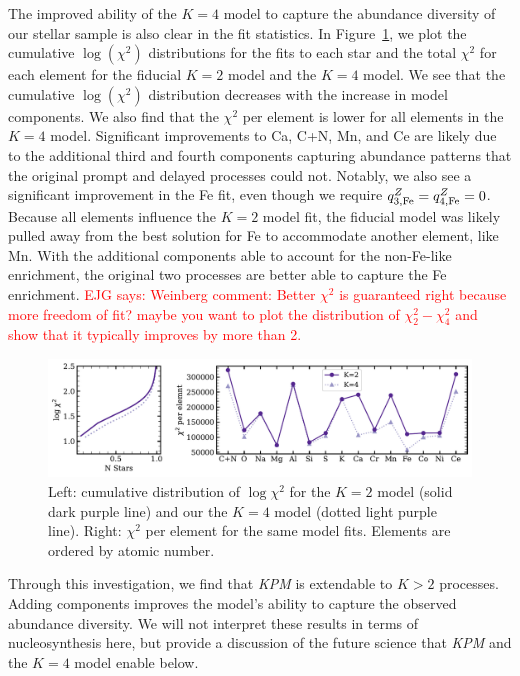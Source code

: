 \documentclass[modern]{aastex631}
\newcommand{\ejg}[1]{\textcolor{red}{EJG says: #1}}
\newcommand{\name}{\textsl{KPM}}
\begin{document}
The improved ability of the $K=4$ model to capture the abundance diversity of our stellar sample is also clear in the fit statistics. In Figure~\ref{fig:comp_Ks}, we plot the cumulative $\log(\chi^2)$ distributions for the fits to each star and the total $\chi^2$ for each element for the fiducial $K=2$ model and the $K=4$ model. We see that the cumulative $\log(\chi^2)$ distribution decreases with the increase in model components. We also find that the $\chi^2$ per element is lower for all elements in the $K=4$ model. Significant improvements to Ca, C+N, Mn, and Ce are likely due to the additional third and fourth components capturing abundance patterns that the original prompt and delayed processes could not. Notably, we also see a significant improvement in the Fe fit, even though we require $q_{\rm 3,Fe}^{Z} = q_{\rm 4,Fe}^{Z} = 0$. Because all elements influence the $K=2$ model fit, the fiducial model was likely pulled away from the best solution for Fe to accommodate another element, like Mn. With the additional components able to account for the non-Fe-like enrichment, the original two processes are better able to capture the Fe enrichment.  \ejg{Weinberg comment: Better $\chi^2$ is guaranteed right because more freedom of fit? maybe you want to plot the distribution of $\chi^2_2 - \chi^2_4$ and show that it typically improves by more than 2.}

\begin{figure}[htb!]
    \centering
    \includegraphics[width=\textwidth]{Paper/Figures/comp_Ks.pdf}
    \caption{Left: cumulative distribution of $\log \chi^2$ for the $K=2$ model (solid dark purple line) and our the $K=4$ model (dotted light purple line). Right: $\chi^2$ per element for the same model fits. Elements are ordered by atomic number.}
    \label{fig:comp_Ks}
\end{figure}

Through this investigation, we find that \name{} is extendable to $K>2$ processes. Adding components improves the model's ability to capture the observed abundance diversity. We will not interpret these results in terms of nucleosynthesis here, but provide a discussion of the future science that \name{} and the $K=4$ model enable below.
\end{document}
